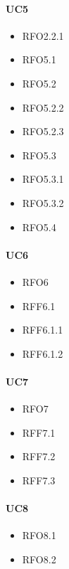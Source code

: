 \paragraph{UC5}
\quad
\begin{multicols}{3}
    \begin{itemize}
        \item RFO2.2.1
        \item RFO5.1
        \item RFO5.2
        \item RFO5.2.2
        \item RFO5.2.3
        \item RFO5.3
        \item RFO5.3.1
        \item RFO5.3.2
        \item RFO5.4
    \end{itemize}
\end{multicols}

\paragraph{UC6}
\quad
\begin{multicols}{3}
    \begin{itemize}
        \item RFO6
        \item RFF6.1
        \item RFF6.1.1
        \item RFF6.1.2
    \end{itemize}
\end{multicols}

\paragraph{UC7}
\quad
\begin{multicols}{3}
    \begin{itemize}
        \item RFO7
        \item RFF7.1
        \item RFF7.2
        \item RFF7.3
    \end{itemize}
\end{multicols}

\paragraph{UC8}
\quad
\begin{multicols}{3}
    \begin{itemize}
        \item RFO8.1
        \item RFO8.2
    \end{itemize}
\end{multicols}

